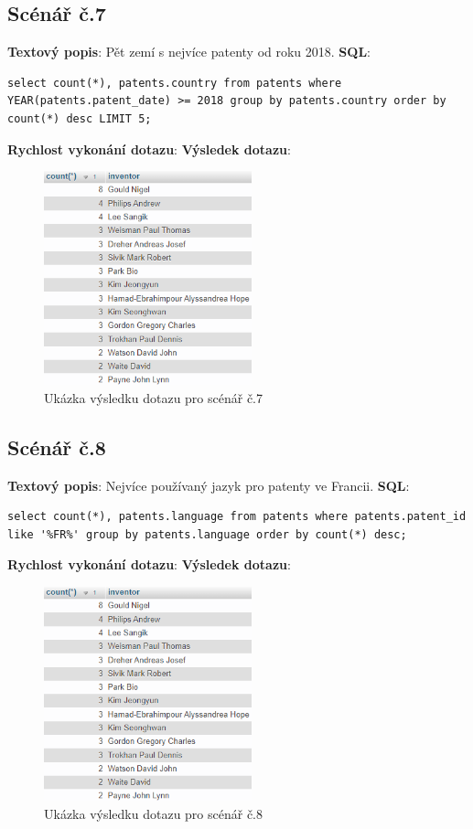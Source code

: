 \subsection{Scénář č.7}
\textbf{Textový popis}: Pět zemí s nejvíce patenty od roku 2018.
\newline
\textbf{SQL}: 
\begin{lstlisting}[label = {lst:elements_a}]
select count(*), patents.country from patents where YEAR(patents.patent_date) >= 2018 group by patents.country order by count(*) desc LIMIT 5;
\end{lstlisting}
\textbf{Rychlost vykonání dotazu}: 
\newline
\textbf{Výsledek dotazu}:
\begin{figure}[H]
\centering
\includegraphics[width=6cm]{img/scenare/scenar_9}
\caption{Ukázka výsledku dotazu pro scénář č.7}
\label{fig:scenar7}
\end{figure}

\subsection{Scénář č.8}
\textbf{Textový popis}: Nejvíce používaný jazyk pro patenty ve Francii.
\newline
\textbf{SQL}: 
\begin{lstlisting}[label = {lst:elements_a}]
select count(*), patents.language from patents where patents.patent_id like '%FR%' group by patents.language order by count(*) desc;
\end{lstlisting}
\textbf{Rychlost vykonání dotazu}: 
\newline
\textbf{Výsledek dotazu}:
\begin{figure}[H]
\centering
\includegraphics[width=6cm]{img/scenare/scenar_9}
\caption{Ukázka výsledku dotazu pro scénář č.8}
\label{fig:scenar8}
\end{figure}

